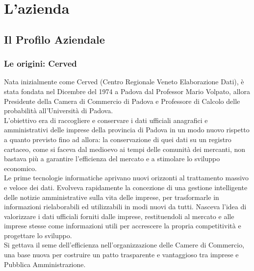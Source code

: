 

\chapter{L'azienda}
\label{cap:azienda}

\section{Il Profilo Aziendale}
\label{sec:il_profilo_aziendale}

	\subsection{Le origini: Cerved}
	Nata inizialmente come Cerved (Centro Regionale Veneto Elaborazione Dati), \nomeAzienda è stata fondata nel Dicembre del 1974 a Padova dal Professor Mario Volpato, allora Presidente della Camera di Commercio di Padova e Professore di Calcolo delle probabilità all'Università di Padova. \\
	L'obiettivo era di raccogliere e conservare i dati ufficiali anagrafici e amministrativi delle imprese della provincia di Padova in un modo nuovo rispetto a quanto previsto fino ad allora: la conservazione di quei dati su un registro cartaceo, come si faceva dal medioevo ai tempi delle comunità dei mercanti, non bastava più a garantire l'efficienza del mercato e a stimolare lo sviluppo economico. \\
	Le prime tecnologie informatiche aprivano nuovi orizzonti al trattamento massivo e veloce dei dati. Evolveva rapidamente la concezione di una gestione intelligente delle notizie amministrative sulla vita delle imprese, per trasformarle in informazioni rielaborabili ed utilizzabili in modi nuovi da tutti. Nasceva l’idea di valorizzare i dati ufficiali forniti dalle imprese, restituendoli al mercato e alle imprese stesse come informazioni utili per accrescere la propria competitività e progettare lo sviluppo.\\
	Si gettava il seme dell’efficienza nell’organizzazione delle Camere di Commercio, una base nuova per costruire un patto trasparente e vantaggioso tra imprese e Pubblica Amministrazione.
	
